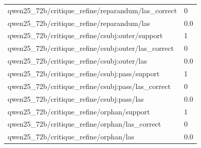 \begin{tabular}{ll}
qwen25\_72b/critique\_refine/reparandum/las\_correct & 0 \\
qwen25\_72b/critique\_refine/reparandum/las & 0.0 \\
qwen25\_72b/critique\_refine/csubj:outer/support & 1 \\
qwen25\_72b/critique\_refine/csubj:outer/las\_correct & 0 \\
qwen25\_72b/critique\_refine/csubj:outer/las & 0.0 \\
qwen25\_72b/critique\_refine/csubj:pass/support & 1 \\
qwen25\_72b/critique\_refine/csubj:pass/las\_correct & 0 \\
qwen25\_72b/critique\_refine/csubj:pass/las & 0.0 \\
qwen25\_72b/critique\_refine/orphan/support & 1 \\
qwen25\_72b/critique\_refine/orphan/las\_correct & 0 \\
qwen25\_72b/critique\_refine/orphan/las & 0.0 \\
\hline
\end{tabular}
